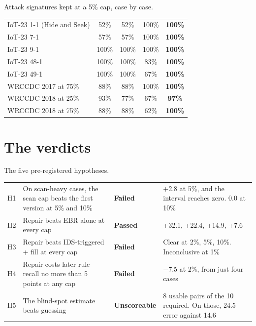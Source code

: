 \begin{gtable}{Attack signatures kept at a 5\% cap, case by case.}
\begin{tabularx}{.9\linewidth}{L c c c c}
\toprule
{} &  &  &  & \\
\midrule
IoT-23 1-1 (Hide and Seek) & 52\% & 52\% & 100\% & \textbf{100\%}\\
IoT-23 7-1 & 57\% & 57\% & 100\% & \textbf{100\%}\\
IoT-23 9-1 & 100\% & 100\% & 100\% & \textbf{100\%}\\
IoT-23 48-1 & 100\% & 100\% & 83\% & \textbf{100\%}\\
IoT-23 49-1 & 100\% & 100\% & 67\% & \textbf{100\%}\\
WRCCDC 2017 at 75\% & 88\% & 88\% & 100\% & \textbf{100\%}\\
WRCCDC 2018 at 25\% & 93\% & 77\% & 67\% & \textbf{97\%}\\
WRCCDC 2018 at 75\% & 88\% & 88\% & 62\% & \textbf{100\%}\\
\bottomrule
\end{tabularx}
\end{gtable}

\section{The verdicts}
\begin{gtable}{The five pre-registered hypotheses.}
\begin{tabularx}{\linewidth}{l L l L}
\toprule
\hd{} &  &  & \\
\midrule
H1 & On scan-heavy cases, the scan cap beats the first version at 5\% and 10\% & \textbf{Failed} & +2.8 at 5\%, and the interval reaches zero. 0.0 at 10\%\\
H2 & Repair beats EBR alone at every cap & \textbf{Passed} & +32.1, +22.4, +14.9, +7.6\\
H3 & Repair beats IDS-triggered + fill at every cap & \textbf{Failed} & Clear at 2\%, 5\%, 10\%. Inconclusive at 1\%\\
H4 & Repair costs later-rule recall no more than 5 points at any cap & \textbf{Failed} & $-$7.5 at 2\%, from just four cases\\
H5 & The blind-spot estimate beats guessing & \textbf{Unscoreable} & 8 usable pairs of the 10 required. On those, 24.5 error against 14.6\\
\bottomrule
\end{tabularx}
\end{gtable}

